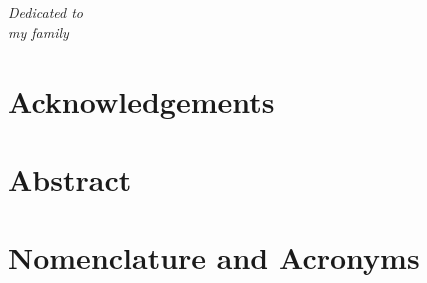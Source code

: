 \documentclass[12pt,a4paper]{book}
\begin{document}


$\ $
\thispagestyle{empty}  %
\chapter*{}



\begin{flushright}
\textit{Dedicated to \\
my family}
\end{flushright} 

\newpage

\chapter*{Acknowledgements} \label{chap:Acknowledgements}  %
{} %


\newpage

\chapter*{Abstract} \label{chap:Abstract}
{} %



\newpage

\chapter*{Nomenclature and Acronyms} \label{chap:NomenclatureAcronyms}  %
{} %


\let\OLDthebibliography=\thebibliography
\def\thebibliography#1{\OLDthebibliography{#1}%
\addcontentsline{toc}{chapter}{\bibname}}
\end{document}
